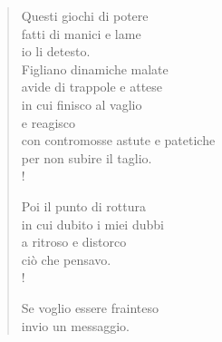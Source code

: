 
\begin{verse}
    Questi giochi di potere\\
    fatti di manici e lame\\
    io li detesto.\\
    Figliano dinamiche malate\\
    avide di trappole e attese\\
    in cui finisco al vaglio\\
    e reagisco\\
    con contromosse astute e patetiche\\
    per non subire il taglio.\\!

    Poi il punto di rottura\\
    in cui dubito i miei dubbi\\
    a ritroso e distorco\\
    ciò che pensavo.\\!

    Se voglio essere frainteso\\
    invio un messaggio.
\end{verse}